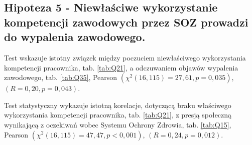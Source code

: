 \documentclass[a4paper,12pt,twoside,openright]{mwrep}
\begin{document}
  
  


 	
	


   
	

\vspace{\baselineskip} 

\subsection*{Hipoteza 5 - Niewłaściwe wykorzystanie kompetencji zawodowych przez SOZ prowadzi do wypalenia zawodowego.}





Test wskazuje  istotny związek między poczuciem niewłaściwego wykorzystania kompetencji pracownika, tab. \ref{tab:Q21}, a odczuwaniem objawów wypalenia zawodowego, tab. \ref{tab:Q35}, Pearson $(\chi^2 (16, 115) = 27,61, p = 0,035)$, $(R = 0,20, p = 0,043)$.

Test statystyczny wykazuje istotną korelacje, dotyczącą braku właściwego wykorzystania kompetencji pracownika, tab. \ref{tab:Q21}, z presją społeczną wynikającą z oczekiwań wobec Systemu Ochrony Zdrowia, tab. \ref{tab:Q15}, Pearson $(\chi^2 (16, 115) = 47,47, p < 0,001)$, $(R = 0,24, p = 0,012)$.







%
\end{document}
